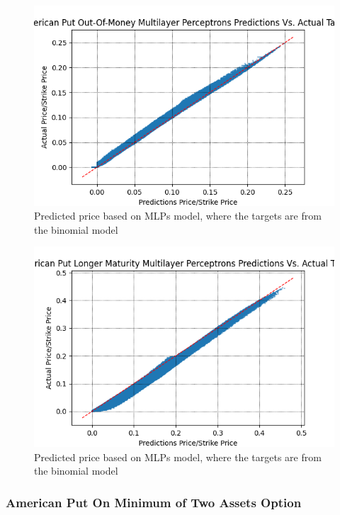 \begin{figure}[th]
\centering
\includegraphics{Figures/PredictionOutMoneyAmerP.png}
\decoRule
\caption[MLPs Predictions Vs. Actual Prices For American Put]{Predicted price based on MLPs model, where the targets are from the binomial model}
\label{fig:PredictionOutMoneyAmerP}
\end{figure}

\begin{figure}[th]
\centering
\includegraphics{Figures/PredictionLongTAmerP.png}
\decoRule
\caption[MLPs Predictions Vs. Actual Prices For American Put]{Predicted price based on MLPs model, where the targets are from the binomial model}
\label{fig:PredictionOutMoneyAmerP}
\end{figure}

\subsubsection{American Put On Minimum of Two Assets Option}












